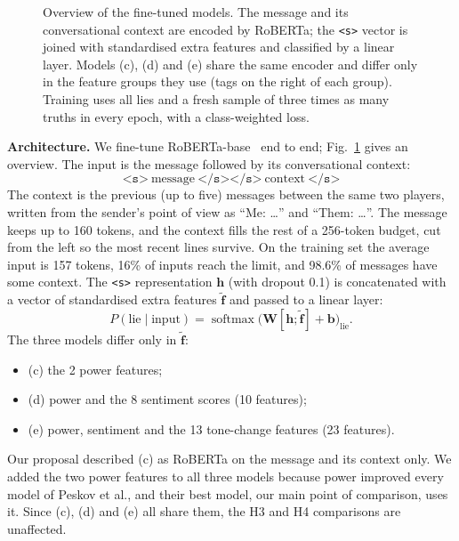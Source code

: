 \documentclass[conference]{IEEEtran}
\begin{document}
\begin{figure}[t]
\caption{Overview of the fine-tuned models. The message and its conversational context are encoded by RoBERTa; the \texttt{<s>} vector is joined with standardised extra features and classified by a linear layer. Models (c), (d) and (e) share the same encoder and differ only in the feature groups they use (tags on the right of each group). Training uses all lies and a fresh sample of three times as many truths in every epoch, with a class-weighted loss.}
\label{fig:arch}
\end{figure}

\textbf{Architecture.} We fine-tune RoBERTa-base~\cite{liu2019roberta} end to end; Fig.~\ref{fig:arch} gives an overview. The input is the message followed by its conversational context:
\[
\texttt{<s>}\ \text{message}\ \texttt{</s></s>}\ \text{context}\ \texttt{</s>}
\]
The context is the previous (up to five) messages between the same two players, written from the sender's point of view as ``Me: \dots'' and ``Them: \dots''. The message keeps up to 160 tokens, and the context fills the rest of a 256-token budget, cut from the left so the most recent lines survive. On the training set the average input is 157 tokens, 16\% of inputs reach the limit, and 98.6\% of messages have some context. The \texttt{<s>} representation $\mathbf{h}$ (with dropout 0.1) is concatenated with a vector of standardised extra features $\tilde{\mathbf{f}}$ and passed to a linear layer:
\begin{equation}
P(\text{lie}\mid \text{input}) = \operatorname{softmax}\bigl(\mathbf{W}[\mathbf{h};\tilde{\mathbf{f}}] + \mathbf{b}\bigr)_{\text{lie}}.
\end{equation}
The three models differ only in $\tilde{\mathbf{f}}$:
\begin{itemize}
\item (c) the 2 power features;
\item (d) power and the 8 sentiment scores (10 features);
\item (e) power, sentiment and the 13 tone-change features (23 features).
\end{itemize}
Our proposal described (c) as RoBERTa on the message and its context only. We added the two power features to all three models because power improved every model of Peskov et al., and their best model, our main point of comparison, uses it. Since (c), (d) and (e) all share them, the H3 and H4 comparisons are unaffected.
\end{document}
